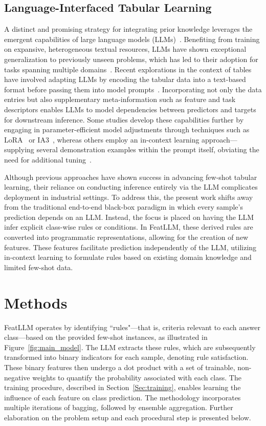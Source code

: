 \subsection{Language-Interfaced Tabular Learning} A distinct and promising strategy for integrating prior knowledge leverages the emergent capabilities of large language models (LLMs)~\cite{anil2023palm,openai2023gpt4}. Benefiting from training on expansive, heterogeneous textual resources, LLMs have shown exceptional generalization to previously unseen problems, which has led to their adoption for tasks spanning multiple domains~\cite{brown2020language}. Recent explorations in the context of tables have involved adapting LLMs by encoding the tabular data into a text-based format before passing them into model prompts~\cite{dinh2022lift,hegselmann2023tabllm,wang2023anypredict}. Incorporating not only the data entries but also supplementary meta-information such as feature and task descriptors enables LLMs to model dependencies between predictors and targets for downstream inference. Some studies develop these capabilities further by engaging in parameter-efficient model adjustments through techniques such as LoRA~\cite{hu2021lora} or IA3~\cite{liu2022few}, whereas others employ an in-context learning approach—supplying several demonstration examples within the prompt itself, obviating the need for additional tuning~\cite{dinh2022lift,hegselmann2023tabllm,nam2023semi,slack2023tablet}.

Although previous approaches have shown success in advancing few-shot tabular learning, their reliance on conducting inference entirely via the LLM complicates deployment in industrial settings. To address this, the present work shifts away from the traditional end-to-end black-box paradigm in which every sample's prediction depends on an LLM. Instead, the focus is placed on having the LLM infer explicit class-wise rules or conditions. In \textsf{FeatLLM}, these derived rules are converted into programmatic representations, allowing for the creation of new features. These features facilitate prediction independently of the LLM, utilizing in-context learning to formulate rules based on existing domain knowledge and limited few-shot data.

\section{Methods}
\textsf{FeatLLM} operates by identifying ``rules"—that is, criteria relevant to each answer class—based on the provided few-shot instances, as illustrated in Figure~\ref{fig:main_model}. The LLM extracts these rules, which are subsequently transformed into binary indicators for each sample, denoting rule satisfaction. These binary features then undergo a dot product with a set of trainable, non-negative weights to quantify the probability associated with each class. The training procedure, described in Section~\ref{Sec:training}, enables learning the influence of each feature on class prediction. The methodology incorporates multiple iterations of bagging, followed by ensemble aggregation. Further elaboration on the problem setup and each procedural step is presented below.

